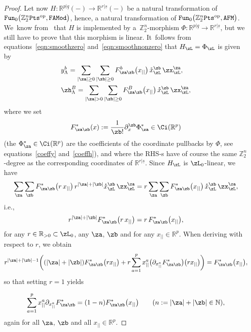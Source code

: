 \documentclass[10pt,a4paper]{amsart}
\newcommand{\op}[1]{\operatorname{#1}}
\newcommand{\R}{{\mathbb R}}
\newcommand{\Z}{{\mathbb Z}}
\def\ul{\underline}
\def\ul{\underline}
\newcommand{\0}{\otimes}
\newcommand{\z}{\Z_2^n}
\numberwithin{equation}{section}
\begin{document}
\begin{proof}
Let now $H\colon \R^{p|\ul q}(-)\to \R^{r|\ul s}(-)$ be a natural transformation of ${\tt Fun}_0\big(\z{\tt Pts}^{\op{op}},\tt FAMod\big)$, hence, a natural transformation of ${\tt Fun}_0\big(\z{\tt Pts}^{\op{op}},\tt AFM\big)$. We~know from~\cite{Bruce:2019b} that $H$ is implemented by a~$\z$-morphism $\Phi\colon \R^{p|\ul q}\to \R^{r|\ul s}$, but we still have to prove that this morphism is linear. It~follows from equations~\eqref{eqn:smoothzero} and~\eqref{eqn:smoothnonzero} that $H_\zL=\Phi_\zL$ is given by
\begin{subequations}
\begin{align}
& y^b_\Lambda = \sum_{|\za|\ge 0}\sum_{|\zb|\ge 0}F^b_{\za\zb}\big(x_{||}\big)\,\mathring{x}_\zL^\zb\,\zx_\zL^\za, \label{eqn:smoothzero2}\\
& \zh^B_\Lambda =\sum_{|\za|> 0}\sum_{|\zb|\ge 0}F^B_{\za\zb}\big(x_{||}\big)\,\mathring{x}_\zL^\zb\,\zx_\zL^\za, \label{eqn:smoothnonzero2}
\end{align}
\end{subequations}
where we set
\begin{gather}\label{ExplForm}
F^\ast_{\za\zb}(x):=\frac{1}{\zb !}\partial_x^\zb\Phi_\za^\ast\in\Ci(\R^p)
\end{gather}
(the $\Phi^*_\za\in\Ci(\R^p)$ are the coefficients of the coordinate pullbacks by $\Phi$, see equations~\eqref{coeffy} and~\eqref{coeffh}), and where the {\small RHS}-s have of course the same $\z$-degree as the corresponding coordinates of $\R^{r|\ul s}$. Since $H_\zL$ is $\zL_0$-linear, we have
\[
\sum_{\za}\sum_{\zb}F^\ast_{\za\zb}\big(r\, x_{||}\big)\,r^{|\za|+|\zb|}\mathring{x}_\zL^\zb\,\zx_\zL^\za=r\sum_{\za}\sum_{\zb}F^\ast_{\za\zb}\big(x_{||}\big)\,\mathring{x}_\zL^\zb\,\zx_\zL^\za,
\]
i.e.,
\[
r^{|\za|+|\zb|}F^\ast_{\za\zb}\big(r\, x_{||}\big)=r\, F^\ast_{\za\zb}\big(x_{||}\big) ,
\]
for any $r\in\R_{>0}\subset\zL_0$, any $\za$, $\zb$ and for any $x_{||}\in\R^p$. When deriving with respect to $r$, we obtain
\[
r^{|\za|+|\zb|-1}\bigg((|\za|+|\zb|)F^\ast_{\za\zb}\big(r x_{||}\big)+r\sum_{a=1}^{p}x_{||}^a\big(\partial_{x^a_{||}} F^*_{\za\zb}\big)\big(r x_{||}\big)\bigg)=F_{\za\zb}^\ast\big(x_{||}\big),
\]
so that setting $r=1$ yields
{\samepage\begin{gather}\label{EVF}
\sum_{a=1}^{p}x_{||}^a\partial_{x^a_{||}} F^*_{\za\zb}=(1-n)F_{\za\zb}^\ast\big(x_{||}\big)\qquad
(n:=|\za|+|\zb|\in\mathbb{N}),
\end{gather}
again for all $\za$, $\zb$ and all $x_{||}\in\R^p$.

}


\end{proof}
\end{document}
